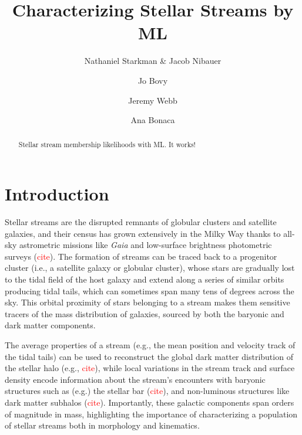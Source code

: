 \documentclass[twocolumn]{aastex631}
\newcommand{\TODO}[1]{{\textcolor{red}{#1}}}
\newcommand{\JN}[1]{\TODO{#1}}
\begin{document}
\title{Characterizing Stellar Streams by ML}

\author{Nathaniel Starkman \& Jacob Nibauer}
\author{Jo Bovy}
\author{Jeremy Webb}
\author{Ana Bonaca}

\begin{abstract}
    Stellar stream membership likelihoods with ML. It works!
\end{abstract}

\section{Introduction} \label{sec:intro}
    Stellar streams are the disrupted remnants of globular clusters and satellite galaxies, and their census has grown extensively in the Milky Way thanks to all-sky astrometric missions like {\it Gaia} and low-surface brightness photometric surveys (\JN{cite}). The formation of streams can be traced back to a progenitor cluster (i.e., a satellite galaxy or globular cluster), whose stars are gradually lost to the tidal field of the host galaxy and extend along a series of similar orbits producing tidal tails, which can sometimes span many tens of degrees across the sky. This orbital proximity of stars belonging to a stream makes them sensitive tracers of the mass distribution of galaxies, sourced by both the baryonic and dark matter components.
    
    The average properties of a stream (e.g., the mean position and velocity track of the tidal tails) can be used to reconstruct the global dark matter distribution of the stellar halo (e.g., \JN{cite}), while local variations in the stream track and surface density encode information about the stream's encounters with baryonic structures such as (e.g.) the stellar bar (\JN{cite}), and non-luminous structures like dark matter subhalos (\JN{cite}). Importantly, these galactic components span orders of magnitude in mass, highlighting the importance of characterizing a population of stellar streams both in morphology and kinematics. 
\end{document}
